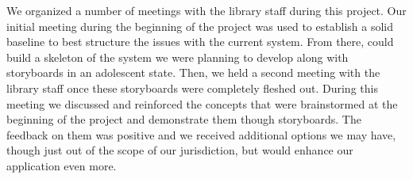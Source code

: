 We organized a number of meetings with the library staff during this project. Our initial meeting during the beginning of the project was used to establish a solid baseline to best structure the issues with the current system. From there, could build a skeleton of the system we were planning to develop along with storyboards in an adolescent state. Then, we held a second meeting with the library staff once these storyboards were completely fleshed out. During this meeting we discussed and reinforced the concepts that were brainstormed at the beginning of the project and demonstrate them though storyboards. The feedback on them was positive and we received additional options we may have, though just out of the scope of our jurisdiction, but would enhance our application even more.